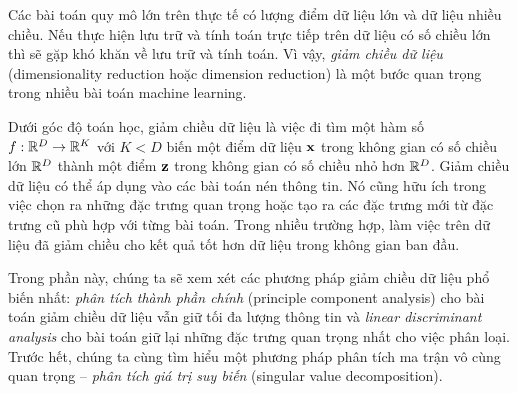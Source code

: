 Các bài toán quy mô lớn trên thực tế có lượng điểm dữ liệu lớn và dữ liệu nhiều
chiều. Nếu thực hiện lưu trữ và tính toán trực tiếp trên dữ liệu có số chiều lớn
thì sẽ gặp khó khăn về lưu trữ và tính toán. Vì vậy, \textit{giảm
chiều dữ liệu} ({dimensionality reduction} hoặc {dimension reduction}) là một
bước quan trọng trong nhiều bài toán machine learning.


Dưới góc độ toán học, giảm chiều dữ liệu là việc đi tìm một hàm số $f: \mathbb{R}^D
\rightarrow \mathbb{R}^K$ với $K < D$ biến một điểm dữ liệu $\mathbf{x}$ trong không gian có số
chiều lớn $\mathbb{R}^D$ thành một điểm $\mathbf{z}$ trong không gian có số chiều nhỏ hơn
$\mathbb{R}^D$. Giảm chiều dữ liệu có thể áp dụng vào các bài toán nén thông tin. Nó cũng hữu ích trong việc chọn ra những đặc trưng quan trọng hoặc
tạo ra các đặc trưng mới từ đặc trưng cũ phù hợp với từng bài toán. Trong nhiều trường hợp, làm việc trên dữ liệu đã giảm chiều cho kết quả tốt
hơn dữ liệu trong không gian ban đầu.

Trong phần này, chúng ta sẽ xem xét các phương pháp giảm chiều dữ liệu phổ biến
nhất: \textit{phân tích thành phần chính} ({principle component analysis}) cho bài toán giảm chiều dữ liệu
vẫn giữ tối đa lượng thông tin và \textit{linear discriminant analysis}
cho bài toán giữ lại những đặc trưng quan trọng nhất cho việc phân loại. Trước
hết, chúng ta cùng tìm hiểu một phương pháp phân tích ma trận vô
cùng quan trọng  --  \textit{phân tích giá trị suy biến} ({singular value decomposition}).
